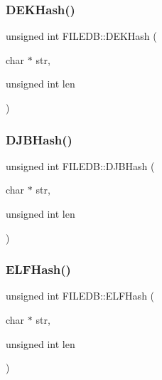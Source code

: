 \mbox{\label{namespaceFILEDB_ab2561866ca3a62230f86ec7860fec260}} 
\subsubsection{\texorpdfstring{DEKHash()}{DEKHash()}}
{\footnotesize\ttfamily unsigned int F\+I\+L\+E\+D\+B\+::\+D\+E\+K\+Hash (\begin{DoxyParamCaption}\item[{char $\ast$}]{str,  }\item[{unsigned int}]{len }\end{DoxyParamCaption})}

\mbox{\label{namespaceFILEDB_a7d5f1ce86b07fb3c5ec314fab9bd5e30}} 
\subsubsection{\texorpdfstring{DJBHash()}{DJBHash()}}
{\footnotesize\ttfamily unsigned int F\+I\+L\+E\+D\+B\+::\+D\+J\+B\+Hash (\begin{DoxyParamCaption}\item[{char $\ast$}]{str,  }\item[{unsigned int}]{len }\end{DoxyParamCaption})}

\mbox{\label{namespaceFILEDB_ad02d1b620691350d964deb5beab272eb}} 
\subsubsection{\texorpdfstring{ELFHash()}{ELFHash()}}
{\footnotesize\ttfamily unsigned int F\+I\+L\+E\+D\+B\+::\+E\+L\+F\+Hash (\begin{DoxyParamCaption}\item[{char $\ast$}]{str,  }\item[{unsigned int}]{len }\end{DoxyParamCaption})}

\mbox{\label{namespaceFILEDB_ae588550e41a7b104b78a0e81ceb24a46}} 

